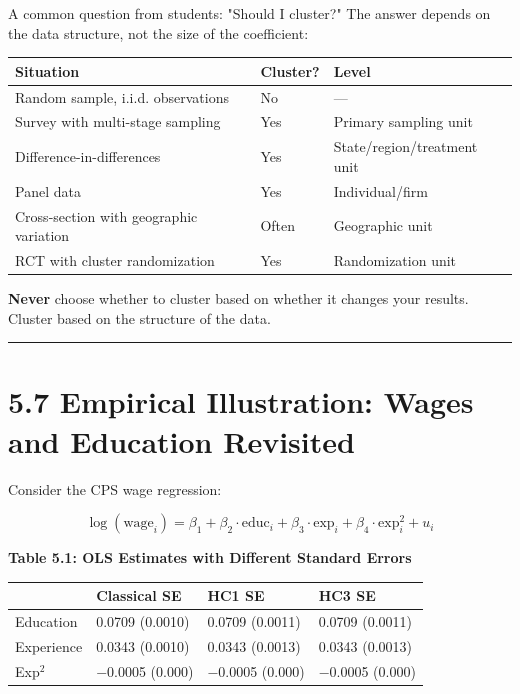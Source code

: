 A common question from students: "Should I cluster?" The answer depends on the data structure, not the size of the coefficient:

\begin{center}
\begin{tabular}{@{} l l l @{}}
\toprule
\textbf{Situation} & \textbf{Cluster?} & \textbf{Level} \\
\midrule
Random sample, i.i.d. observations & No & --- \\
Survey with multi-stage sampling & Yes & Primary sampling unit \\
Difference-in-differences & Yes & State/region/treatment unit \\
Panel data & Yes & Individual/firm \\
Cross-section with geographic variation & Often & Geographic unit \\
RCT with cluster randomization & Yes & Randomization unit \\
\bottomrule
\end{tabular}
\end{center}

\textbf{Never} choose whether to cluster based on whether it changes your results. Cluster based on the structure of the data.

\medskip\hrule\medskip

\section{5.7 Empirical Illustration: Wages and Education Revisited}

Consider the CPS wage regression:

\[
\log(\text{wage}_i) = \beta_1 + \beta_2 \cdot \text{educ}_i + \beta_3 \cdot \text{exp}_i + \beta_4 \cdot \text{exp}_i^2 + u_i
\]

\textbf{Table 5.1: OLS Estimates with Different Standard Errors}

\begin{center}
\begin{tabular}{@{} l l l l @{}}
\toprule
\textbf{} & \textbf{Classical SE} & \textbf{HC1 SE} & \textbf{HC3 SE} \\
\midrule
Education & 0.0709 (0.0010) & 0.0709 (0.0011) & 0.0709 (0.0011) \\
Experience & 0.0343 (0.0010) & 0.0343 (0.0013) & 0.0343 (0.0013) \\
Exp$^{2}$ & $-$0.0005 (0.000) & $-$0.0005 (0.000) & $-$0.0005 (0.000) \\
\bottomrule
\end{tabular}
\end{center}

